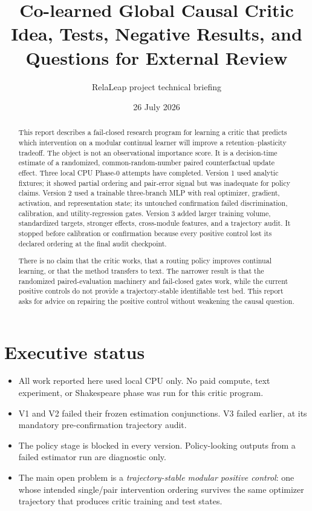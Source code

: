 \documentclass[11pt]{article}
\title{Co-learned Global Causal Critic\\Idea, Tests, Negative Results, and Questions for External Review}
\author{RelaLeap project technical briefing}
\date{26 July 2026}
\begin{document}
\maketitle

\begin{abstract}
This report describes a fail-closed research program for learning a critic that predicts which intervention on a modular continual learner will improve a retention--plasticity tradeoff. The object is not an observational importance score. It is a decision-time estimate of a randomized, common-random-number paired counterfactual update effect. Three local CPU Phase-0 attempts have completed. Version 1 used analytic fixtures; it showed partial ordering and pair-error signal but was inadequate for policy claims. Version 2 used a trainable three-branch MLP with real optimizer, gradient, activation, and representation state; its untouched confirmation failed discrimination, calibration, and utility-regression gates. Version 3 added larger training volume, standardized targets, stronger effects, cross-module features, and a trajectory audit. It stopped before calibration or confirmation because every positive control lost its declared ordering at the final audit checkpoint.

There is no claim that the critic works, that a routing policy improves continual learning, or that the method transfers to text. The narrower result is that the randomized paired-evaluation machinery and fail-closed gates work, while the current positive controls do not provide a trajectory-stable identifiable test bed. This report asks for advice on repairing the positive control without weakening the causal question.
\end{abstract}

\section{Executive status}
\begin{itemize}
\item All work reported here used local CPU only. No paid compute, text experiment, or Shakespeare phase was run for this critic program.
\item V1 and V2 failed their frozen estimation conjunctions. V3 failed earlier, at its mandatory pre-confirmation trajectory audit.
\item The policy stage is blocked in every version. Policy-looking outputs from a failed estimator run are diagnostic only.
\item The main open problem is a \emph{trajectory-stable modular positive control}: one whose intended single/pair intervention ordering survives the same optimizer trajectory that produces critic training and test states.
\end{itemize}
\end{document}
